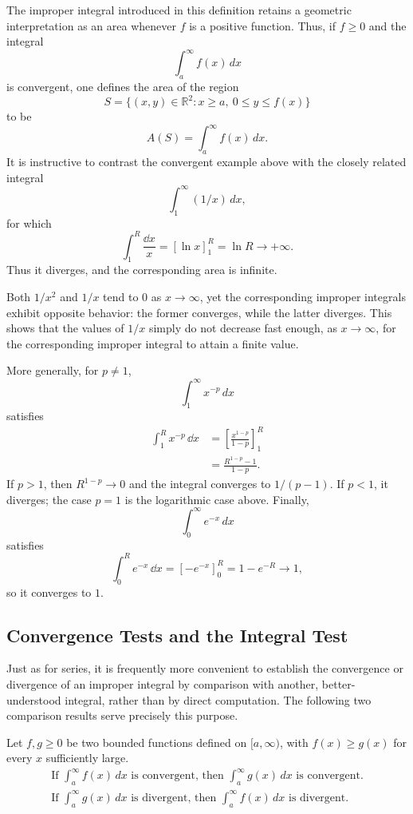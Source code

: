 The improper integral introduced in this definition retains a geometric interpretation as an area whenever $f$ is a positive function. Thus, if $f \geq 0$ and the integral
\[
\int_a^{\infty} f(x) \, dx
\]
is convergent, one defines the area of the region
\[
S = \{ (x,y) \in \mathbb{R}^2 : x \geq a, \ 0 \leq y \leq f(x) \}
\]
to be
\[
A(S) = \int_a^{\infty} f(x) \, dx.
\]
It is instructive to contrast the convergent example above with the closely related integral
\[
\int_1^{\infty} (1/x) \, dx,
\]
for which
\[
\int_1^R\frac{\dd x}{x}=[\ln x]_1^R=\ln R\longrightarrow+\infty.
\]
Thus it diverges, and the corresponding area is infinite.

\begin{remark}
Both $1/x^2$ and $1/x$ tend to $0$ as $x \to \infty$, yet the corresponding improper integrals exhibit opposite behavior: the former converges, while the latter diverges. This shows that the values of $1/x$ simply do not decrease fast enough, as $x \to \infty$, for the corresponding improper integral to attain a finite value.
\end{remark}

More generally, for $p\neq1$, \[
\int_1^{\infty} x^{-p} \, dx
\] satisfies
\[
\begin{aligned}
\int_1^R x^{-p}\,\dd x
&=\left[\frac{x^{1-p}}{1-p}\right]_1^R\\
&=\frac{R^{1-p}-1}{1-p}.
\end{aligned}
\]
If $p>1$, then $R^{1-p}\to0$ and the integral converges to
$1/(p-1)$. If $p<1$, it diverges; the case $p=1$ is the logarithmic
case above. Finally, \[
\int_0^{\infty} e^{-x} \, dx
\] satisfies \[
\int_0^R e^{-x}\,\dd x=[-e^{-x}]_0^R=1-e^{-R}\longrightarrow1,
\] so it converges to $1$.



\subsection{Convergence Tests and the Integral Test}

Just as for series, it is frequently more convenient to establish the convergence or divergence of an improper integral by comparison with another, better-understood integral, rather than by direct computation. The following two comparison results serve precisely this purpose.

\begin{theorem}
Let $f, g \geq 0$ be two bounded functions defined on $[a, \infty)$, with $f(x) \geq g(x)$ for every $x$ sufficiently large.
\[
\begin{gathered}
\text{If }\int_a^{\infty} f(x) \, dx
\text{ is convergent, then }\int_a^{\infty} g(x) \, dx
\text{ is convergent.} \\
\text{If }\int_a^{\infty} g(x) \, dx
\text{ is divergent, then }\int_a^{\infty} f(x) \, dx
\text{ is divergent.}
\end{gathered}
\]

\end{theorem}

